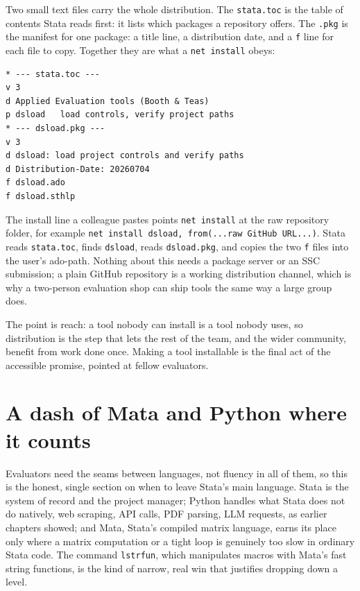 \documentclass[
    a4paper,
    fontsize=10pt,
    twoside=true,
    numbers=noenddot,
]{kaobook}
\begin{document}
Two small text files carry the whole distribution. The \texttt{stata.toc} is the table of contents Stata reads first: it lists which packages a repository offers. The \texttt{.pkg} is the manifest for one package: a title line, a distribution date, and a \texttt{f} line for each file to copy. Together they are what a \texttt{net install} obeys:
{\footnotesize
\begin{verbatim}
* --- stata.toc ---
v 3
d Applied Evaluation tools (Booth & Teas)
p dsload   load controls, verify project paths
* --- dsload.pkg ---
v 3
d dsload: load project controls and verify paths
d Distribution-Date: 20260704
f dsload.ado
f dsload.sthlp
\end{verbatim}
}
The install line a colleague pastes points \texttt{net install} at the raw repository folder, for example \texttt{net install dsload, from(...raw GitHub URL...)}. Stata reads \texttt{stata.toc}, finds \texttt{dsload}, reads \texttt{dsload.pkg}, and copies the two \texttt{f} files into the user's ado-path. Nothing about this needs a package server or an SSC submission; a plain GitHub repository is a working distribution channel, which is why a two-person evaluation shop can ship tools the same way a large group does.

The point is reach: a tool nobody can install is a tool nobody uses, so distribution is the step that lets the rest of the team, and the wider community, benefit from work done once. Making a tool installable is the final act of the accessible promise, pointed at fellow evaluators.

\section{A dash of Mata and Python where it counts}
Evaluators need the seams between languages, not fluency in all of them, so this is the honest, single section on when to leave Stata's main language. Stata is the system of record and the project manager; Python handles what Stata does not do natively, web scraping, API calls, PDF parsing, LLM requests, as earlier chapters showed; and Mata, Stata's compiled matrix language, earns its place only where a matrix computation or a tight loop is genuinely too slow in ordinary Stata code. The command \texttt{lstrfun}, which manipulates macros with Mata's fast string functions, is the kind of narrow, real win that justifies dropping down a level.
\end{document}
